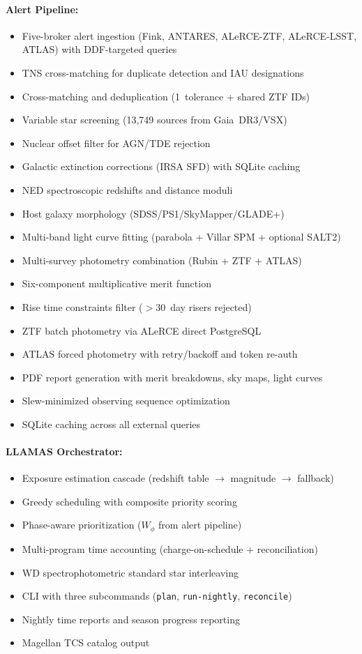 \documentclass[11pt,letterpaper]{article}
\begin{document}
\paragraph{Alert Pipeline:}
\begin{itemize}
\item Five-broker alert ingestion (Fink, ANTARES, ALeRCE-ZTF,
ALeRCE-LSST, ATLAS) with DDF-targeted queries
\item TNS cross-matching for duplicate detection and IAU designations
\item Cross-matching and deduplication (1\arcsec\ tolerance + shared ZTF IDs)
\item Variable star screening (13{,}749 sources from Gaia~DR3/VSX)
\item Nuclear offset filter for AGN/TDE rejection
\item Galactic extinction corrections (IRSA SFD) with SQLite caching
\item NED spectroscopic redshifts and distance moduli
\item Host galaxy morphology (SDSS/PS1/SkyMapper/GLADE+)
\item Multi-band light curve fitting (parabola + Villar SPM + optional SALT2)
\item Multi-survey photometry combination (Rubin + ZTF + ATLAS)
\item Six-component multiplicative merit function
\item Rise time constraints filter ($>$30~day risers rejected)
\item ZTF batch photometry via ALeRCE direct PostgreSQL
\item ATLAS forced photometry with retry/backoff and token re-auth
\item PDF report generation with merit breakdowns, sky maps, light curves
\item Slew-minimized observing sequence optimization
\item SQLite caching across all external queries
\end{itemize}

\paragraph{LLAMAS Orchestrator:}
\begin{itemize}
\item Exposure estimation cascade (redshift table $\to$ magnitude $\to$ fallback)
\item Greedy scheduling with composite priority scoring
\item Phase-aware prioritization ($W_\phi$ from alert pipeline)
\item Multi-program time accounting (charge-on-schedule + reconciliation)
\item WD spectrophotometric standard star interleaving
\item CLI with three subcommands (\texttt{plan}, \texttt{run-nightly},
\texttt{reconcile})
\item Nightly time reports and season progress reporting
\item Magellan TCS catalog output
\end{itemize}
\end{document}
